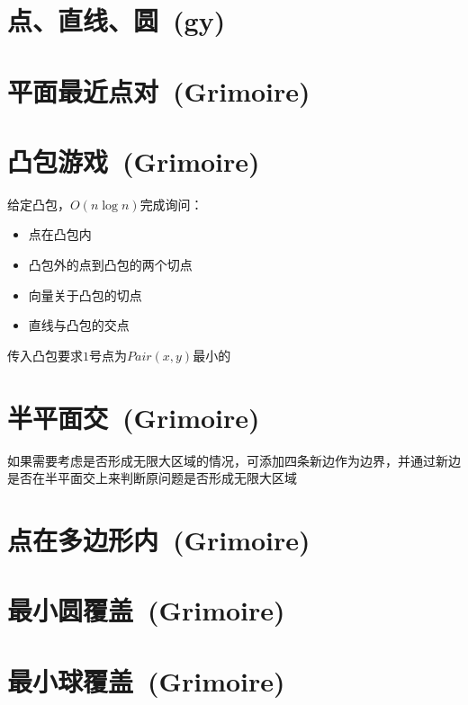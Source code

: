 \section{点、直线、圆\ \small(gy)}

\section{平面最近点对\ \small(Grimoire)}

\section{凸包游戏\ \small(Grimoire)}
    \noindent 给定凸包，$ O(n \log n) $完成询问：
    \begin{itemize}[wide=0pt]
        \item 点在凸包内
        \item 凸包外的点到凸包的两个切点
        \item 向量关于凸包的切点
        \item 直线与凸包的交点
    \end{itemize}
    传入凸包要求$ 1 $号点为$ Pair(x, y) $最小的

\section{半平面交\ \small(Grimoire)}
    如果需要考虑是否形成无限大区域的情况，可添加四条新边作为边界，并通过新边是否在半平面交上来判断原问题是否形成无限大区域

\section{点在多边形内\ \small(Grimoire)}

\section{最小圆覆盖\ \small(Grimoire)}

\section{最小球覆盖\ \small(Grimoire)}

